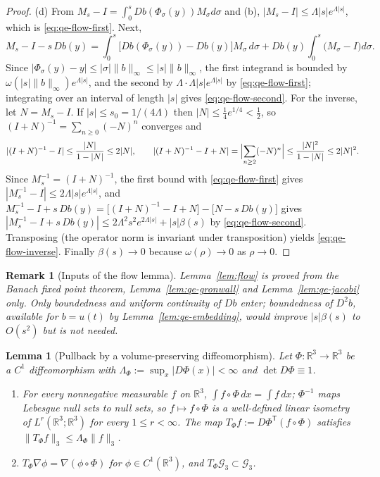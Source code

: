 \documentclass[11pt]{article}
\newtheorem{remark}[theorem]{Remark}
\newtheorem{lemma}[theorem]{Lemma}
\theoremstyle{definition}
\theoremstyle{plain}
\newcommand{\R}{\mathbb R}
\newcommand{\norm}[1]{\lVert #1\rVert}
\begin{document}
\begin{proof}
(d) From $M_s-I=\int_0^sDb(\Phi_\sigma(y))M_\sigma d\sigma$ and (b),
$|M_s-I|\le\Lambda|s|e^{\Lambda|s|}$, which is \eqref{eq:qe-flow-first}.
Next,
\[
 M_s-I-s\,Db(y)
 =\int_0^s\bigl[Db(\Phi_\sigma(y))-Db(y)\bigr]M_\sigma\,d\sigma
 +Db(y)\int_0^s\bigl(M_\sigma-I\bigr)d\sigma .
\]
Since $|\Phi_\sigma(y)-y|\le|\sigma|\norm b_\infty\le|s|\norm b_\infty$, the
first integrand is bounded by $\omega(|s|\norm b_\infty)e^{\Lambda|s|}$, and
the second by $\Lambda\cdot\Lambda|s|e^{\Lambda|s|}$ by
\eqref{eq:qe-flow-first}; integrating over an interval of length $|s|$
gives \eqref{eq:qe-flow-second}.  For the inverse, let $N=M_s-I$.  If
$|s|\le s_0=1/(4\Lambda)$ then $|N|\le\frac14e^{1/4}<\frac12$, so
$(I+N)^{-1}=\sum_{n\ge0}(-N)^n$ converges and
\[
 |(I+N)^{-1}-I|\le\frac{|N|}{1-|N|}\le2|N|,
 \qquad
 |(I+N)^{-1}-I+N|=\Bigl|\sum_{n\ge2}(-N)^n\Bigr|\le\frac{|N|^2}{1-|N|}\le2|N|^2 .
\]
Since $M_s^{-1}=(I+N)^{-1}$, the first bound with \eqref{eq:qe-flow-first}
gives $|M_s^{-1}-I|\le2\Lambda|s|e^{\Lambda|s|}$, and
$M_s^{-1}-I+s\,Db(y)=\bigl[(I+N)^{-1}-I+N\bigr]-\bigl[N-s\,Db(y)\bigr]$ gives
$|M_s^{-1}-I+s\,Db(y)|\le2\Lambda^2s^2e^{2\Lambda|s|}+|s|\beta(s)$ by
\eqref{eq:qe-flow-second}.  Transposing (the operator norm is invariant
under transposition) yields \eqref{eq:qe-flow-inverse}.  Finally
$\beta(s)\to0$ because $\omega(\rho)\to0$ as $\rho\to0$.
\end{proof}

\begin{remark}[Inputs of the flow lemma]\label{rem:qe-flow-inputs}
Lemma~\ref{lem:flow} is proved from the Banach fixed point theorem,
Lemma~\ref{lem:qe-gronwall} and Lemma~\ref{lem:qe-jacobi} only.  Only
boundedness and uniform continuity of $Db$ enter; boundedness of $D^2b$,
available for $b=u(t)$ by Lemma~\ref{lem:qe-embedding}, would improve
$|s|\beta(s)$ to $O(s^2)$ but is not needed.
\end{remark}

\begin{lemma}[Pullback by a volume-preserving diffeomorphism]
\label{lem:qe-pullback}
Let $\Phi:\R^3\to\R^3$ be a $C^1$ diffeomorphism with
$\Lambda_\Phi:=\sup_x|D\Phi(x)|<\infty$ and $\det D\Phi\equiv1$.
\begin{enumerate}
\item[(a)] For every nonnegative measurable $f$ on $\R^3$,
 $\int f\circ\Phi\,dx=\int f\,dx$; $\Phi^{-1}$ maps Lebesgue null sets to
 null sets, so $f\mapsto f\circ\Phi$ is a well-defined linear isometry of
 $L^r(\R^3;\R^3)$ for every $1\le r<\infty$.  The map
 $T_\Phi f:=D\Phi^{\mathsf T}(f\circ\Phi)$ satisfies
 $\norm{T_\Phi f}_3\le\Lambda_\Phi\norm f_3$.
\item[(b)] $T_\Phi\nabla\phi=\nabla(\phi\circ\Phi)$ for $\phi\in C^1(\R^3)$,
 and $T_\Phi\mathcal G_3\subset\mathcal G_3$.
\end{enumerate}
\end{lemma}
\end{document}
